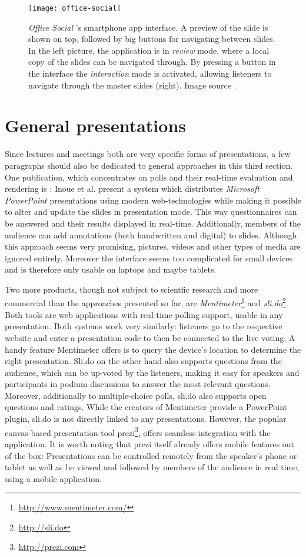 \begin{figure}
\centering
\texttt{[image: office-social]}
\caption{\emph{Office Social} \cite{Chattopadhyay:OfficeSocialRemoteControl}'s smartphone app interface. A preview of the slide is shown on top, followed by big buttons for navigating between slides. In the left picture, the application is in \emph{review} mode, where a local copy of the slides can be navigated through. By pressing a button in the interface the \emph{interaction} mode is activated, allowing listeners to navigate through the master slides (right). Image source \cite{Chattopadhyay:OfficeSocialRemoteControl}.}
\label{fig:related-work-crowd-feedback}
\end{figure}

\section{General presentations}
\label{sec:related-work-general}
Since lectures and meetings both are very specific forms of presentations, a few paragraphs should also be dedicated to general approaches in this third section.
One publication, which concentrates on polls and their real-time evaluation and rendering is \cite{Inoue:RealTimeQuestionnaire}: Inoue et al. present a system which distributes \emph{Microsoft PowerPoint} presentations using modern web-technologies while making it possible to alter and update the slides in presentation mode. This way questionnaires can be answered and their results displayed in real-time. Additionally, members of the audience can add annotations (both handwritten and digital) to slides. Although this approach seems very promising, pictures, videos and other types of media are ignored entirely. Moreover the interface seems too complicated for small devices and is therefore only usable on laptops and maybe tablets.

Two more products, though not subject to scientfic research and more commercial than the approaches presented so far, are \emph{Mentimeter}\footnote{\url{http://www.mentimeter.com/}} and \emph{sli.do}\footnote{\url{http://sli.do}}. Both tools are web applications with real-time polling support, usable in any presentation. Both systems work very similarly: listeners go to the respective website and enter a presentation code to then be connected to the live voting. A handy feature Mentimeter offers is to query the device's location to determine the right presentation. Sli.do on the other hand also supports questions from the audience, which can be up-voted by the listeners, making it easy for speakers and participants in podium-discussions to answer the most relevant questions. Moreover, additionally to multiple-choice polls, sli.do also supports open questions and ratings. While the creators of Mentimeter provide a PowerPoint plugin, sli.do is not directly linked to any presentations. However, the popular canvas-based presentation-tool prezi\footnote{\url{http://prezi.com}}, offers seamless integration with the application. It is worth noting that prezi itself already offers mobile features out of the box: Presentations can be controlled remotely from the speaker's phone or tablet as well as be viewed and followed by members of the audience in real time, using a mobile application.

